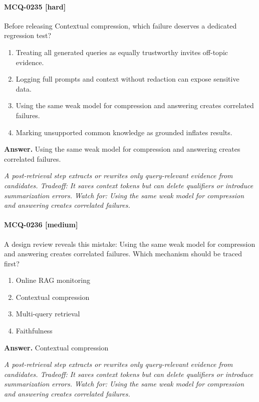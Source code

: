 \paragraph{MCQ-0235 [hard]} Before releasing Contextual compression, which failure deserves a dedicated regression test?
\begin{enumerate}[label=\Alph*.]
\item Treating all generated queries as equally trustworthy invites off-topic evidence.
\item Logging full prompts and context without redaction can expose sensitive data.
\item Using the same weak model for compression and answering creates correlated failures.
\item Marking unsupported common knowledge as grounded inflates results.
\end{enumerate}
\noindent\textbf{Answer.} Using the same weak model for compression and answering creates correlated failures.
\par\textit{A post-retrieval step extracts or rewrites only query-relevant evidence from candidates. Tradeoff: It saves context tokens but can delete qualifiers or introduce summarization errors. Watch for: Using the same weak model for compression and answering creates correlated failures.}
\paragraph{MCQ-0236 [medium]} A design review reveals this mistake: Using the same weak model for compression and answering creates correlated failures. Which mechanism should be traced first?
\begin{enumerate}[label=\Alph*.]
\item Online RAG monitoring
\item Contextual compression
\item Multi-query retrieval
\item Faithfulness
\end{enumerate}
\noindent\textbf{Answer.} Contextual compression
\par\textit{A post-retrieval step extracts or rewrites only query-relevant evidence from candidates. Tradeoff: It saves context tokens but can delete qualifiers or introduce summarization errors. Watch for: Using the same weak model for compression and answering creates correlated failures.}
